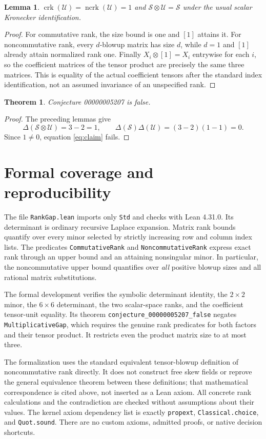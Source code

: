 \documentclass[11pt,letterpaper]{article}
\newtheorem{theorem}{Theorem}
\newtheorem{lemma}{Lemma}
\newcommand{\crk}{\operatorname{crk}}
\newcommand{\ncrk}{\operatorname{ncrk}}
\begin{document}
\begin{lemma}\label{lem:unit}
$\crk(\mathcal U)=\ncrk(\mathcal U)=1$ and
$\mathcal S\otimes\mathcal U=\mathcal S$ under the usual scalar
Kronecker identification.
\end{lemma}
\begin{proof}
For commutative rank, the size bound is one and $[1]$ attains it.
For noncommutative rank, every $d$-blowup matrix has size $d$, while
$d=1$ and $[1]$ already attain normalized rank one.
Finally $X_i\otimes[1]=X_i$ entrywise for each $i$, so the coefficient
matrices of the tensor product are precisely the same three matrices.
This is equality of the actual coefficient tensors after the standard
index identification, not an assumed invariance of an unspecified rank.
\end{proof}

\begin{theorem}
Conjecture 00000005207 is false.
\end{theorem}
\begin{proof}
The preceding lemmas give
\[
 \Delta(\mathcal S\otimes\mathcal U)=3-2=1,
 \qquad
 \Delta(\mathcal S)\Delta(\mathcal U)=(3-2)(1-1)=0.
\]
Since $1\ne0$, equation \eqref{eq:claim} fails.
\end{proof}

\section{Formal coverage and reproducibility}
The file \texttt{RankGap.lean} imports only \texttt{Std} and checks
with Lean 4.31.0. Its determinant is ordinary recursive Laplace
expansion. Matrix rank bounds quantify over every minor selected by
strictly increasing row and column index lists. The predicates
\texttt{CommutativeRank} and \texttt{NoncommutativeRank} express exact
rank through an upper bound and an attaining nonsingular minor.
In particular, the noncommutative upper bound quantifies over \emph{all}
positive blowup sizes and all rational matrix substitutions.

The formal development verifies the symbolic determinant identity,
the $2\times2$ minor, the $6\times6$ determinant, the two scalar-space
ranks, and the coefficient tensor-unit equality. Its theorem
\texttt{conjecture\_00000005207\_false} negates
\texttt{MultiplicativeGap}, which requires the genuine rank predicates
for both factors and their tensor product. It restricts even the
product matrix size to at most three.

The formalization uses the standard equivalent tensor-blowup definition
of noncommutative rank directly. It does not construct free skew fields
or reprove the general equivalence theorem between these definitions;
that mathematical correspondence is cited above, not inserted as a Lean
axiom. All concrete rank calculations and the contradiction are checked
without assumptions about their values. The kernel axiom dependency
list is exactly \texttt{propext}, \texttt{Classical.choice}, and
\texttt{Quot.sound}. There are no custom axioms, admitted proofs, or
native decision shortcuts.
\end{document}
